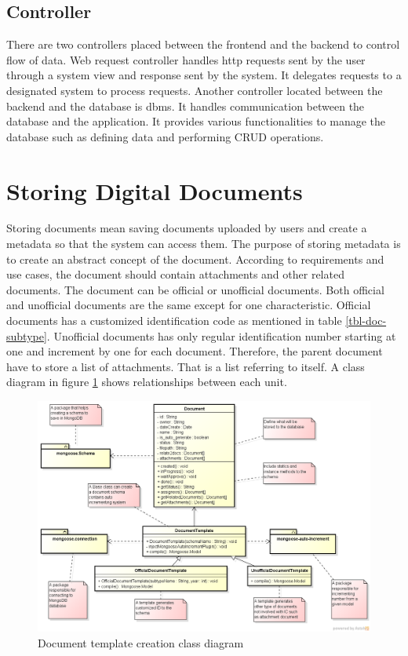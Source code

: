 \subsection{Controller}
There are two controllers placed between the frontend and the backend to control flow of data.
Web request controller handles \gls{http} requests sent by the user through a system view and response sent by the system.
It delegates requests to a designated system to process requests.
Another controller located between the backend and the database is \gls{dbms}.
It handles communication between the database and the application.
It provides various functionalities to manage the database such as defining data and performing CRUD operations.

\section{Storing Digital Documents}
Storing documents mean saving documents uploaded by users and create a metadata so that the system can access them.
The purpose of storing metadata is to create an abstract concept of the document.
According to requirements and use cases, the document should contain attachments and other related documents.
The document can be official or unofficial documents.
Both official and unofficial documents are the same except for one characteristic.
Official documents has a customized identification code as mentioned in table \ref{tbl-doc-subtype}.
Unofficial documents has only regular identification number starting at one and increment by one for each document.
Therefore, the parent document have to store a list of attachments.
That is a list referring to itself.
A class diagram in figure \ref{fig:doc-template} shows relationships between each unit.

\begin{figure}
	\caption{Document template creation class diagram}
	\label{fig:doc-template}
	\includegraphics[scale=0.5]{res/software-design/document_templating}
\end{figure}

